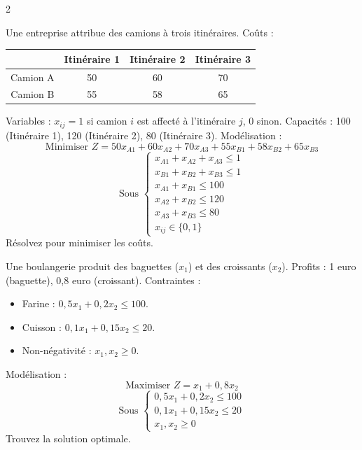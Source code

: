 \begin{multicols}{2}
\begin{exercice}
	Une entreprise attribue des camions à trois itinéraires. Coûts :
	\begin{center}
		\begin{tabular}{c|ccc}
			& Itinéraire 1 & Itinéraire 2 & Itinéraire 3 \\
			\hline
			Camion A & 50 & 60 & 70 \\
			Camion B & 55 & 58 & 65 \\
		\end{tabular}
	\end{center}
	Variables : \(x_{ij} = 1\) si camion \(i\) est affecté à l'itinéraire \(j\), 0 sinon. Capacités : 100 (Itinéraire 1), 120 (Itinéraire 2), 80 (Itinéraire 3).
	Modélisation :
	\[
	\text{Minimiser } Z = 50x_{A1} + 60x_{A2} + 70x_{A3} + 55x_{B1} + 58x_{B2} + 65x_{B3}
	\]
	\[
	\text{Sous } \begin{cases}
	x_{A1} + x_{A2} + x_{A3} \leq 1 \\
	x_{B1} + x_{B2} + x_{B3} \leq 1 \\
	x_{A1} + x_{B1} \leq 100 \\
	x_{A2} + x_{B2} \leq 120 \\
	x_{A3} + x_{B3} \leq 80 \\
	x_{ij} \in \{0,1\}
	\end{cases}
	\]
	Résolvez pour minimiser les coûts.
\end{exercice}

\begin{exercice}
	Une boulangerie produit des baguettes (\(x_1\)) et des croissants (\(x_2\)). Profits : 1 euro (baguette), 0,8 euro (croissant). Contraintes :
	\begin{itemize}
		\item Farine : \(0,5x_1 + 0,2x_2 \leq 100\).
		\item Cuisson : \(0,1x_1 + 0,15x_2 \leq 20\).
		\item Non-négativité : \(x_1, x_2 \geq 0\).
	\end{itemize}
	Modélisation :
	\[
	\text{Maximiser } Z = x_1 + 0,8x_2
	\]
	\[
	\text{Sous } \begin{cases}
	0,5x_1 + 0,2x_2 \leq 100 \\
	0,1x_1 + 0,15x_2 \leq 20 \\
	x_1, x_2 \geq 0
	\end{cases}
	\]
	Trouvez la solution optimale.
\end{exercice}


\end{multicols}
